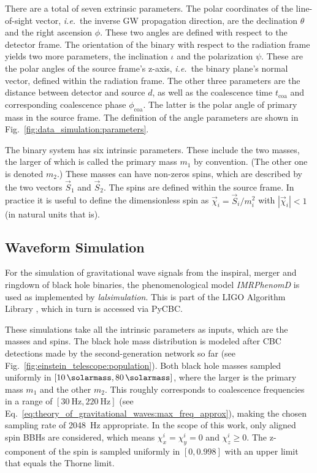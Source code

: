 There are a total of seven extrinsic parameters. The polar coordinates of the line-of-sight vector, \emph{i.e.}\ the inverse GW propagation direction, are the declination $\theta$ and the right ascension $\phi$. These two angles are defined with respect to the detector frame. 
The orientation of the binary with respect to the radiation frame yields two more parameters, the inclination $\iota$ and the polarization $\psi$. These are the polar angles of the source frame's z-axis, \emph{i.e.}\ the binary plane's normal vector, defined within the radiation frame. 
The other three parameters are the distance between detector and source $d$, as well as the coalescence time $t_\text{coa}$ and corresponding coalescence phase $\phi_\text{coa}$. The latter is the polar angle of primary mass in the source frame. The definition of the angle parameters are shown in Fig.~\ref{fig:data_simulation:parameters}.

The binary system has six intrinsic parameters. 
These include the two masses, the larger of which is called the primary mass $m_1$ by convention. (The other one is denoted $m_2$.) These masses can have non-zeros spins, which are described by the two vectors $\vec{S}_1$ and $\vec{S}_2$. The spins are defined within the source frame. In practice it is useful to define the dimensionless spin as $\vec{\chi}_i = \vec{S}_i / m_i^2$ with $|\vec{\chi}_i| < 1$ (in natural units that is).

\subsection*{Waveform Simulation}

For the simulation of gravitational wave signals from the inspiral, merger and ringdown of black hole binaries, the phenomenological model \emph{IMRPhenomD} \cite{PhysRevD.93.044007} is used as implemented by \emph{lalsimulation}. This is part of the LIGO Algorithm Library \cite{lalsuite}, which in turn is accessed via PyCBC.

These simulations take all the intrinsic parameters as inputs, which are the masses and spins.
The black hole mass distribution is modeled after CBC detections made by the second-generation network so far (see Fig.~\ref{fig:einstein_telescope:population}). Both black hole masses sampled uniformly in $[\SI{10}{\solarmass}, \SI{80}{\solarmass}]$, where the larger is the primary mass $m_1$ and the other $m_2$. 
This roughly corresponds to coalescence frequencies in a range of $[\SI{30}{\hertz}, \SI{220}{\hertz}]$ (see Eq.~\ref{eq:theory_of_gravitational_waves:max_freq_approx}), making the chosen sampling rate of \SI{2048}{\hertz} appropriate.
In the scope of this work, only aligned spin BBHs are considered, which means $\chi^i_x = \chi^i_y = 0$ and $\chi^i_z \geq 0$. The z-component of the spin is sampled uniformly in $[0, 0.998]$ with an upper limit that equals the Thorne limit. 


